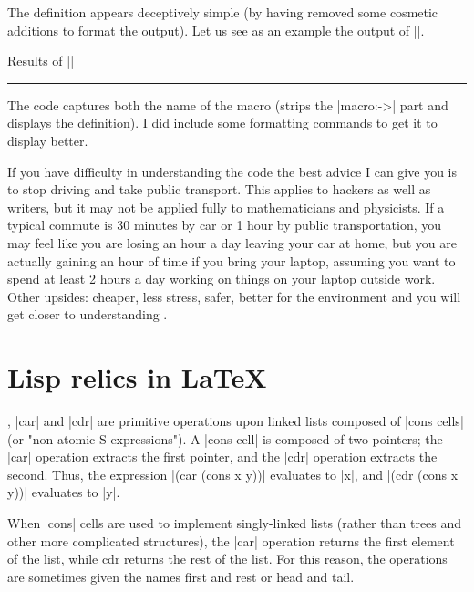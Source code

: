 \noindent The definition appears deceptively simple (by having removed some cosmetic additions to format the output). Let us see as an example the output of ||.
\bigskip


\hfil\hfill Results of || 

\smallskip


\hrule
\medskip
\makeatletter
\def\showcommand{\@star@or@long\accommand}
\fboxrule=0.0pt
\def\accommand#1{\framebox[3cm][l]{\bf\color{red} 
    \string#1:~~} %
     \parbox[t]{7cm}{\expandafter\strip@prefix\meaning#1}} 
\showcommand*{\frogking}
\makeatother
\smallskip



\bigskip


The code captures both the name of the macro (strips the |macro:->| part and displays the definition). I did include some formatting commands to get it to display better.

If you have difficulty in understanding the code the best advice I can give you is to stop driving and take public transport. This applies to hackers as well as writers, but it may not be applied fully to mathematicians and physicists. If a typical commute is 30 minutes by car or 1 hour by public transportation, you may feel like you are losing an hour a day leaving your car at home, but you are actually gaining an hour of time if you bring your laptop, assuming you want to spend at least 2 hours a day working on things on your laptop outside work. Other upsides: cheaper, less stress, safer, better for the environment and you will get closer to understanding \tex.


\section*{Lisp relics in \protect\LaTeX\ }
, |car| and |cdr| are primitive operations upon linked lists composed of |cons cells| (or "non-atomic S-expressions"). A |cons cell| is composed of two pointers; the |car| operation extracts the first pointer, and the |cdr| operation extracts the second.
Thus, the expression |(car (cons x y))| evaluates to |x|, and |(cdr (cons x y))| evaluates to |y|.

When |cons| cells are used to implement singly-linked lists (rather than trees and other more complicated structures), the |car| operation returns the first element of the list, while cdr returns the rest of the list. For this reason, the operations are sometimes given the names first and rest or head and tail.

